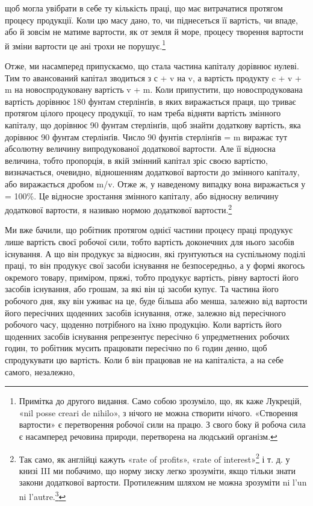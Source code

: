 \parcont{}  %
щоб могла увібрати в себе ту кількість праці, що має витрачатися протягом процесу продукції. Коли цю
масу дано, то, чи піднесеться її вартість, чи впаде, або й зовсім не матиме вартости, як от земля й
море, процесу творення вартости й зміни вартости це ані трохи не порушує.\footnote{
Примітка до другого видання. Само собою зрозуміло, що, як каже Лукрецій, «nil posse creari de
nihilo», з нічого не можна створити нічого. «Створення вартости» є перетворення робочої сили на
працю. З свого боку й робоча сила є насамперед речовина природи, перетворена на людський організм.
}

Отже, ми насамперед припускаємо, що стала частина капіталу дорівнює нулеві. Тим то авансований
капітал зводиться з с + v на v, а вартість продукту c + v + m на новоспродуковану вартість v + m.
Коли припустити, що новоспродукована вартість дорівнює 180 фунтам стерлінґів, в яких виражається
праця, що триває протягом цілого процесу продукції, то нам треба відняти вартість змінного капіталу,
що дорівнює 90 фунтам стерлінґів, щоб знайти
додаткову вартість, яка дорівнює 90 фунтам стерлінґів. Число 90 фунтів стерлінґів = m виражає тут
абсолютну величину випродукованої додаткової вартости. Але її відносна величина, тобто пропорція, в
якій змінний капітал зріс своєю вартістю, визначається, очевидно, відношенням додаткової вартости до
змінного капіталу, або виражається дробом m/v. Отже ж, у наведеному випадку вона виражається у 
= 100\%. Це відносне зростання
змінного капіталу, або відносну величину додаткової вартости, я називаю нормою додаткової
вартости.\footnote{
Так само, як англійці кажуть «rate of profits», «rate of interest»\footnote*{
— «норма зиску», «норма процента». \emph{Ред.}
} і т. д. у книзі III ми
побачимо, що норму зиску легко зрозуміти, якщо тільки знати закони додаткової вартости. Протилежним
шляхом не можна зрозуміти ni l’un ni l’autre.\footnote*{
— ні того, ні другого. \emph{Ред.}
}
}

Ми вже бачили, що робітник протягом однієї частини процесу праці продукує лише вартість своєї
робочої сили, тобто вартість доконечних для нього засобів існування. А що він продукує за відносин,
які ґрунтуються на суспільному поділі праці, то він продукує свої засоби існування не безпосередньо,
а у формі якогось окремого товару, приміром, пряжі, тобто продукує вартість, рівну вартості його
засобів існування, або грошам, за які
він ці засоби купує. Та частина його робочого дня, яку він уживає на це, буде більша або менша,
залежно від вартости його пересічних щоденних засобів існування, отже, залежно від пересічного
робочого часу, щоденно потрібного на їхню продукцію. Коли вартість його щоденних засобів існування
репрезентує пересічно
6 упредметнених робочих годин, то робітник мусить працювати пересічно по 6 годин денно, щоб
спродукувати цю вартість. Коли б він працював не на капіталіста, а на себе самого, незалежно,
\parbreak{}  %

